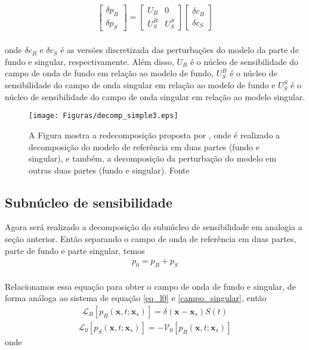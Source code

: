 \begin{eqnarray}
 \begin{bmatrix}
   \delta p_{B}  \\
   \delta p_{S}
\end{bmatrix}
=
\begin{bmatrix}
 {U}_{B}      & 0   \\ 
 {U}_{S}^{B}  & {U}_{S}^{S}
\end{bmatrix}
\begin{bmatrix}
    {\delta c}_{B}  \\
   {\delta c}_{S}
\end{bmatrix}
\label{sistema_perturbacao}
\end{eqnarray}
\\
onde ${\delta c}_{B}$ e ${\delta c}_{S}$ é as versões discretizada das perturbações do modelo da parte de fundo e singular, respectivamente. Além disso, ${U}_{B}$ é o núcleo de sensibilidade  do campo de onda de fundo em relação ao modelo de fundo, ${U}_{S}^{B}$ é o núcleo de sensibilidade  do campo de onda singular em relação ao modelo de fundo e ${U}_{S}^{S}$ é o núcleo de sensibilidade  do campo de onda singular em relação ao modelo singular. 


\begin{figure}[h!]
  \centering
    \texttt{[image: Figuras/decomp\_simple3.eps]}
\caption{A Figura mostra a redecomposição proposta por \citet{macedo_2014}, onde é realizado a decomposição do modelo de referência em duas partes (fundo e singular), e também, a decomposição da perturbação do modelo em outras duas partes (fundo e singular). Fonte \citet{macedo_2014}}
\label{fig:decomp_simple}
\end{figure}

\subsection{Subnúcleo de sensibilidade}
Agora será realizado a decomposição do subnúcleo de sensibilidade em analogia a seção anterior. Então separando o campo de onda de referência em duas partes, parte de fundo e parte singular, temos \\
\begin{eqnarray}
\nonumber
 p_{0} = p_{B} + p_{S}
\end{eqnarray}
\\
Relacionamos essa equação para obter o campo de onda de fundo e singular, de forma análoga ao sistema de equação \ref{eq_l0} e \ref{campo_singular}, então \\
\begin{eqnarray}
 \mathcal{L}_{B} \left [ p_{B}(\mathbf{x},t;\mathbf{x}_{s}) \right] = \delta (\mathbf{x} - \mathbf{x}_{s}) S(t)
 \label{pb_basic}
\end{eqnarray}
\begin{eqnarray}
 \mathcal{L}_{0} \left [ p_{S} (\mathbf{x},t;\mathbf{x}_{s}) \right] = - \mathcal{V}_{0} \left [ p_{B}(\mathbf{x},t;\mathbf{x}_{s}) \right]
 \label{pert_sing}
\end{eqnarray}
onde

